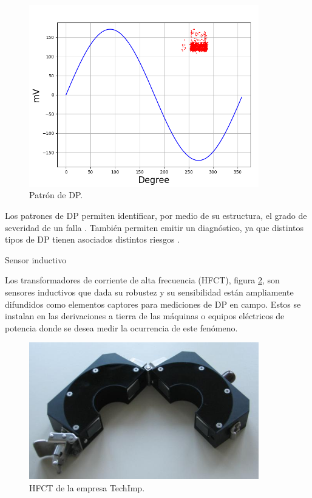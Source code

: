 \begin{figure}[!ht]
	\centering
	\includegraphics[width=100mm]{./Figures/patronEjemplo.png}
	\caption{Patrón de DP.}
	\label{fig:patronEjemplo}
\end{figure}

Los patrones de DP permiten identificar, por medio de su estructura, el grado de severidad de un falla \citep{Gulski:citation}. También permiten emitir un diagnóstico, ya que distintos tipos de DP tienen asociados distintos riesgos \citep{Cavallini:citation}.

Sensor inductivo

Los transformadores de corriente de alta frecuencia (HFCT), figura \ref{fig:hfct}, son sensores inductivos que dada su robustez y su sensibilidad están ampliamente difundidos como elementos captores para mediciones de DP en campo. Estos se instalan en las derivaciones a tierra de las máquinas o equipos eléctricos de potencia donde se desea medir la ocurrencia de este fenómeno.


\begin{figure}[ht]
	\centering
	\includegraphics[width=100mm]{./Figures/hfct1.png}
	\caption{HFCT de la empresa TechImp.}
	\label{fig:hfct}
\end{figure}

